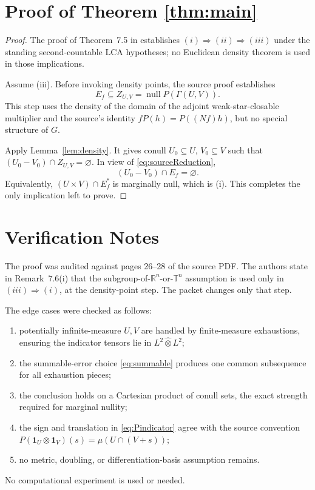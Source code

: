 \documentclass[11pt]{article}
\newcommand{\R}{\mathbb R}
\newcommand{\T}{\mathbb T}
\newcommand{\nul}{\operatorname{null}}
\begin{document}
\section*{Proof of Theorem \ref{thm:main}}

\begin{proof}
The proof of Theorem~7.5 in \cite{STT} establishes
\((i)\Rightarrow(ii)\Rightarrow(iii)\) under the standing
second-countable LCA hypotheses; no Euclidean density theorem is used in
those implications.

Assume (iii).  Before invoking density points, the source proof establishes
\begin{equation}\label{eq:sourceReduction}
                         E_f\subseteq Z_{U,V}
                         =\nul P(\Gamma(U,V)).
\end{equation}
This step uses the density of the domain of the adjoint weak-star-closable
multiplier and the source's identity \(fP(h)=P((Nf)h)\), but no special
structure of \(G\).

Apply Lemma~\ref{lem:density}.  It gives conull
\(U_0\subseteq U\), \(V_0\subseteq V\) such that
\((U_0-V_0)\cap Z_{U,V}=\varnothing\).  In view of
\eqref{eq:sourceReduction},
\[
                         (U_0-V_0)\cap E_f=\varnothing.
\]
Equivalently, \((U\times V)\cap E_f^*\) is marginally null, which is (i).
This completes the only implication left to prove.
\end{proof}

\section*{Verification Notes}

The proof was audited against pages 26--28 of the source PDF.  The authors
state in Remark~7.6(i) that the subgroup-of-\(\R^n\)-or-\(\T^n\) assumption
is used only in \((iii)\Rightarrow(i)\), at the density-point step.  The
packet changes only that step.

The edge cases were checked as follows:
\begin{enumerate}
\item potentially infinite-measure \(U,V\) are handled by finite-measure
exhaustions, ensuring the indicator tensors lie in \(L^2\widehat\otimes L^2\);
\item the summable-error choice \eqref{eq:summable} produces one common
subsequence for all exhaustion pieces;
\item the conclusion holds on a Cartesian product of conull sets, the exact
strength required for marginal nullity;
\item the sign and translation in \eqref{eq:Pindicator} agree with the
source convention \(P(\mathbf1_U\otimes\mathbf1_V)(s)
=\mu(U\cap(V+s))\);
\item no metric, doubling, or differentiation-basis assumption remains.
\end{enumerate}
No computational experiment is used or needed.
\end{document}
